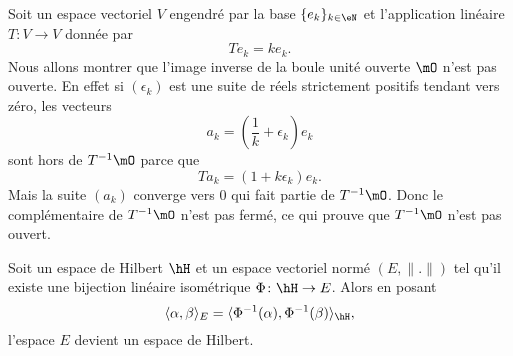 \begin{example}
	Soit un espace vectoriel \( V\) engendré par la base \( \{ e_k \}_{k\in \eN}\) et l'application linéaire \( T\colon V\to V\) donnée par
	\begin{equation}
		Te_k=ke_k.
	\end{equation}
	Nous allons montrer que l'image inverse de la boule unité ouverte \( \mO\) n'est pas ouverte. En effet si \( (\epsilon_k)\) est une suite de réels strictement positifs tendant vers zéro, les vecteurs
	\begin{equation}
		a_k=\left( \frac{1}{ k }+\epsilon_k \right)e_k
	\end{equation}
	sont hors de \( T^{-1}\mO\) parce que
	\begin{equation}
		Ta_k=(1+k\epsilon_k)e_k.
	\end{equation}
	Mais la suite \( (a_k)\) converge vers \( 0\) qui fait partie de \( T^{-1}\mO\). Donc le complémentaire de \( T^{-1}\mO\) n'est pas fermé, ce qui prouve que \( T^{-1}\mO\) n'est pas ouvert.
\end{example}

\begin{proposition}      \label{PROPooMSAYooONHLYq}
	Soit un espace de Hilbert \( \hH\) et un espace vectoriel normé \( (E,\| . \|)\) tel qu'il existe une bijection linéaire isométrique \( \Phi\colon \hH\to E\). Alors en posant
	\begin{equation}
		\langle \alpha, \beta\rangle_E =\langle \Phi^{-1}(\alpha), \Phi^{-1}(\beta)\rangle_{\hH} ,
	\end{equation}
	l'espace \( E\) devient un espace de Hilbert.
\end{proposition}

